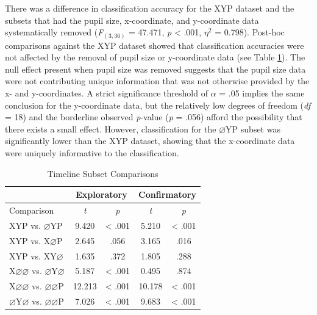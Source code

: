 \documentclass[
  english,
  man,floatsintext]{apa6}
\begin{document}
There was a difference in classification accuracy for the XYP dataset and the subsets that had the pupil size, x-coordinate, and y-coordinate data systematically removed (\emph{F}\(_{(3, 36)}\) = 47.471, \emph{p} \textless{} .001, \textit{$\eta$}\(^{2}\) = 0.798). Post-hoc comparisons against the XYP dataset showed that classification accuracies were not affected by the removal of pupil size or y-coordinate data (see Table \ref{tab:timeline-parcellation-comparisons}). The null effect present when pupil size was removed suggests that the pupil size data were not contributing unique information that was not otherwise provided by the x- and y-coordinates. A strict significance threshold of \(\alpha\) = .05 implies the same conclusion for the y-coordinate data, but the relatively low degrees of freedom (\emph{df} = 18) and the borderline observed \emph{p}-value (\emph{p} = .056) afford the possibility that there exists a small effect. However, classification for the \(\varnothing\)YP subset was significantly lower than the XYP dataset, showing that the x-coordinate data were uniquely informative to the classification.

\begin{table}[!h]
    \centering
    \caption{Timeline Subset Comparisons}
    \label{tab:timeline-parcellation-comparisons}
    \begin{tabular}{l c c c c}
         & \multicolumn{2}{c}{Exploratory} & \multicolumn{2}{c}{Confirmatory} \\
        \hline
        Comparison & \textit{t} & \multicolumn{1}{c|}{\textit{p}} & \textit{t} & \textit{p} \\
        \hline
        XYP vs. $\varnothing$YP & 9.420 & \multicolumn{1}{c|}{< .001} & 5.210 & < .001 \\
        XYP vs. X$\varnothing$P & 2.645 & \multicolumn{1}{c|}{.056} & 3.165 & .016 \\
        XYP vs. XY$\varnothing$ & 1.635 & \multicolumn{1}{c|}{.372} & 1.805 & .288 \\
        X$\varnothing\varnothing$ vs. $\varnothing$Y$\varnothing$ & 5.187 & \multicolumn{1}{c|}{< .001} & 0.495 & .874 \\
        X$\varnothing\varnothing$ vs. $\varnothing\varnothing$P & 12.213 & \multicolumn{1}{c|}{< .001} & 10.178 & < .001 \\
        $\varnothing$Y$\varnothing$ vs. $\varnothing\varnothing$P & 7.026 & \multicolumn{1}{c|}{< .001} & 9.683 & < .001 \\
        \hline
    \end{tabular}
\end{table}
\end{document}
